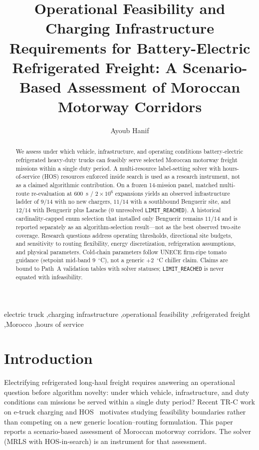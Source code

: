 \documentclass[review,12pt]{elsarticle}
\begin{document}
\begin{frontmatter}
\title{Operational Feasibility and Charging Infrastructure Requirements for Battery-Electric Refrigerated Freight: A Scenario-Based Assessment of Moroccan Motorway Corridors}
\author{Ayoub Hanif}
\address{EMSI / PhD research, Casablanca, Morocco}
\begin{abstract}
We assess under which vehicle, infrastructure, and operating conditions battery-electric refrigerated heavy-duty trucks can feasibly serve selected Moroccan motorway freight missions within a single duty period.
A multi-resource label-setting solver with hours-of-service (HOS) resources enforced inside search is used as a research instrument, not as a claimed algorithmic contribution.
On a frozen 14-mission panel, matched multi-route re-evaluation at $600$~s / $2\times10^{6}$ expansions yields an observed infrastructure ladder of $9/14$ with no new chargers, $11/14$ with a southbound Benguerir site, and $12/14$ with Benguerir plus Larache ($0$ unresolved \texttt{LIMIT\_REACHED}).
A historical cardinality-capped enum selection that installed only Benguerir remains $11/14$ and is reported separately as an algorithm-selection result---not as the best observed two-site coverage.
Research questions address operating thresholds, directional site budgets, and sensitivity to routing flexibility, energy discretization, refrigeration assumptions, and physical parameters.
Cold-chain parameters follow UNECE firm-ripe tomato guidance (setpoint mid-band $9$~$^{\circ}$C), not a generic $+2$~$^{\circ}$C chiller claim.
Claims are bound to Path~A validation tables with solver statuses; \texttt{LIMIT\_REACHED} is never equated with infeasibility.
\end{abstract}
\begin{keyword}
electric truck \sep charging infrastructure \sep operational feasibility \sep refrigerated freight \sep Morocco \sep hours of service
\end{keyword}
\end{frontmatter}

\section{Introduction}
\label{sec:intro}
Electrifying refrigerated long-haul freight requires answering an operational question before algorithm novelty:
under which vehicle, infrastructure, and duty conditions can missions be served within a single duty period?
Recent TR-C work on e-truck charging and HOS~\cite{VidottePlaza2026TRC,Cheng2026TemperatureAware} motivates studying feasibility boundaries rather than competing on a new generic location--routing formulation.
This paper reports a scenario-based assessment of Moroccan motorway corridors.
The solver (MRLS with HOS-in-search) is an instrument for that assessment.
\end{document}
